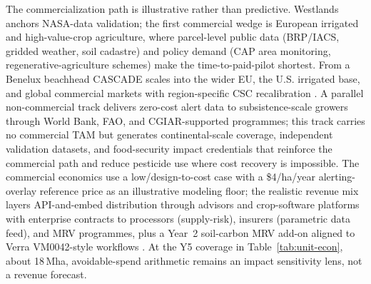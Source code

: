 \documentclass[11pt,letterpaper]{article}
\begin{document}
The commercialization path is illustrative rather than predictive. Westlands anchors NASA-data validation; the first commercial wedge is European irrigated and high-value-crop agriculture, where parcel-level public data (BRP/IACS, gridded weather, soil cadastre) and policy demand (CAP area monitoring, regenerative-agriculture schemes) make the time-to-paid-pilot shortest. From a Benelux beachhead CASCADE scales into the wider EU, the U.S. irrigated base, and global commercial markets with region-specific CSC recalibration \cite{usda-2022,eurostat-farms,fao-aquastat}. A parallel non-commercial track delivers zero-cost alert data to subsistence-scale growers through World Bank, FAO, and CGIAR-supported programmes; this track carries no commercial TAM but generates continental-scale coverage, independent validation datasets, and food-security impact credentials that reinforce the commercial path and reduce pesticide use where cost recovery is impossible. The commercial economics use a low/design-to-cost case with a \$4/ha/year alerting-overlay reference price as an illustrative modeling floor; the realistic revenue mix layers API-and-embed distribution through advisors and crop-software platforms with enterprise contracts to processors (supply-risk), insurers (parametric data feed), and MRV programmes, plus a Year~2 soil-carbon MRV add-on aligned to Verra VM0042-style workflows \cite{verra-vm0042}. At the Y5 coverage in Table~\ref{tab:unit-econ}, about 18\,Mha, avoidable-spend arithmetic remains an impact sensitivity lens, not a revenue forecast.
\end{document}
